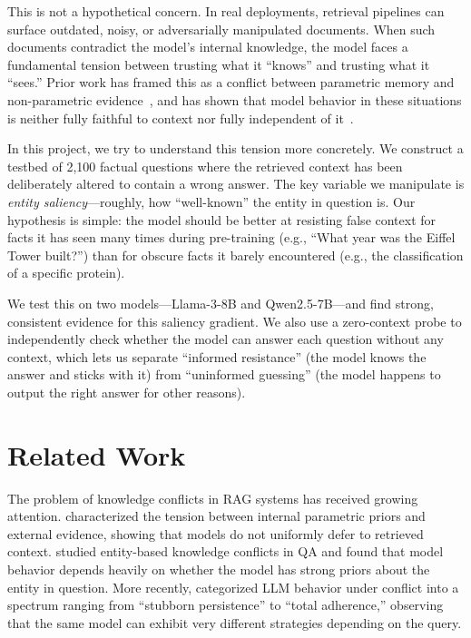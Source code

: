 \documentclass[11pt, letterpaper]{article}
\begin{document}
This is not a hypothetical concern. In real deployments, retrieval pipelines can surface outdated, noisy, or adversarially manipulated documents. When such documents contradict the model's internal knowledge, the model faces a fundamental tension between trusting what it ``knows'' and trusting what it ``sees.'' Prior work has framed this as a conflict between parametric memory and non-parametric evidence~\citep{chen2022rich, longpre2021}, and has shown that model behavior in these situations is neither fully faithful to context nor fully independent of it~\citep{xie2024adaptive}.

In this project, we try to understand this tension more concretely. We construct a testbed of 2,100 factual questions where the retrieved context has been deliberately altered to contain a wrong answer. The key variable we manipulate is \textit{entity saliency}---roughly, how ``well-known'' the entity in question is. Our hypothesis is simple: the model should be better at resisting false context for facts it has seen many times during pre-training (e.g., ``What year was the Eiffel Tower built?'') than for obscure facts it barely encountered (e.g., the classification of a specific protein).

We test this on two models---Llama-3-8B and Qwen2.5-7B---and find strong, consistent evidence for this saliency gradient. We also use a zero-context probe to independently check whether the model can answer each question without any context, which lets us separate ``informed resistance'' (the model knows the answer and sticks with it) from ``uninformed guessing'' (the model happens to output the right answer for other reasons).

\section*{Related Work}

The problem of knowledge conflicts in RAG systems has received growing attention. \citet{chen2022rich} characterized the tension between internal parametric priors and external evidence, showing that models do not uniformly defer to retrieved context. \citet{longpre2021} studied entity-based knowledge conflicts in QA and found that model behavior depends heavily on whether the model has strong priors about the entity in question. More recently, \citet{xie2024adaptive} categorized LLM behavior under conflict into a spectrum ranging from ``stubborn persistence'' to ``total adherence,'' observing that the same model can exhibit very different strategies depending on the query.
\end{document}
